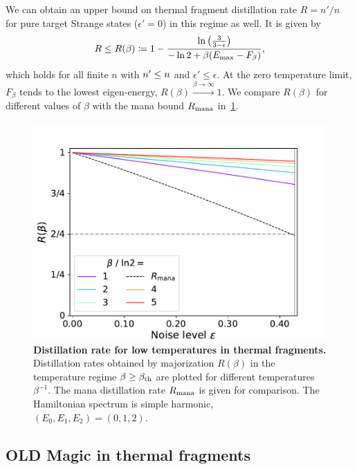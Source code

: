 \documentclass[pra,
aps,
twocolumn,
superscriptaddress,
groupedaddress,
nofootinbib,
reprint
]{revtex4-1}
\begin{document}
We can obtain an upper bound on thermal fragment distillation rate $R=n'/n$ for pure target Strange states ($\epsilon' = 0$) in this regime as well. 
It is given by
\begin{equation}
	R \leq R(\beta) \coloneqq 1 - \frac{\ln{\big(\frac{3}{3-\epsilon} \big)}}{-\ln{2} + \beta (E_{\rm{max}} - F_\beta)},
\end{equation}
which holds for all finite $n$ with $\tt \leq n$ and $\epsilon' \leq \epsilon$.
At the zero temperature limit, $F_\beta$ tends to the lowest eigen-energy, $R(\beta) \xrightarrow{\beta \rightarrow \infty} 1$.
We compare $R(\beta)$ for different values of $\beta$ with the mana bound $R_{\rm{mana}}$ in~\cref{fig:distill_bounds_lowtemp}.
\begin{figure}[h]
    \centering
    \includegraphics[scale=0.5]{figs/distill_bounds_lowtemp.pdf}
    \caption{\textbf{Distillation rate for low temperatures in thermal fragments.} Distillation rates obtained by majorization $R(\beta)$ in the temperature regime $\beta \geq \beta_{\rm{th}}$ are plotted for different temperatures $\beta^{-1}$.
    The mana distillation rate $R_{\rm{mana}}$ is given for comparison.
    The Hamiltonian spectrum is simple harmonic, $(E_0, E_1, E_2) = (0,1,2)$.
    }
    \label{fig:distill_bounds_lowtemp}
\end{figure}




\null\newpage
\null\newpage


\subsection{OLD Magic in thermal fragments}
\end{document}
